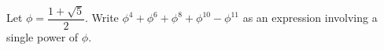 Let $\phi=\dfrac{1+\sqrt5}{2}$. Write $\phi^4+\phi^6+\phi^8+\phi^{10}-\phi^{11}$ as an expression involving a single power of $\phi$.
